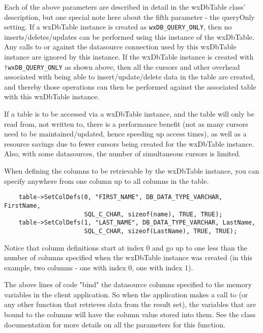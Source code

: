 Each of the above parameters are described in detail in the wxDbTable 
class' description, but one special note here about the fifth 
parameter - the queryOnly setting. If a wxDbTable instance is created as 
{\tt wxDB\_QUERY\_ONLY}, then no inserts/deletes/updates can be performed 
using this instance of the wxDbTable. Any calls to  
or  against the datasource 
connection used by this wxDbTable instance are ignored by this instance. If 
the wxDbTable instance is created with {\tt !wxDB\_QUERY\_ONLY} as shown above, 
then all the cursors and other overhead associated with being able to 
insert/update/delete data in the table are created, and thereby those 
operations can then be performed against the associated table with this 
wxDbTable instance.

If a table is to be accessed via a wxDbTable instance, and the table will 
only be read from, not written to, there is a performance benefit (not as 
many cursors need to be maintained/updated, hence speeding up access times), 
as well as a resource savings due to fewer cursors being created for the 
wxDbTable instance. Also, with some datasources, the number of 
simultaneous cursors is limited. 

When defining the columns to be retrievable by the wxDbTable instance, you 
can specify anywhere from one column up to all columns in the table. 

\begin{verbatim}
    table->SetColDefs(0, "FIRST_NAME", DB_DATA_TYPE_VARCHAR, FirstName,
                      SQL_C_CHAR, sizeof(name), TRUE, TRUE);
    table->SetColDefs(1, "LAST_NAME", DB_DATA_TYPE_VARCHAR, LastName,
                      SQL_C_CHAR, sizeof(LastName), TRUE, TRUE);
\end{verbatim}

Notice that column definitions start at index 0 and go up to one less than 
the number of columns specified when the wxDbTable instance was created 
(in this example, two columns - one with index 0, one with index 1).

The above lines of code "bind" the datasource columns specified to the 
memory variables in the client application. So when the application 
makes a call to  (or any other function that retrieves 
data from the result set), the variables that are bound to the columns will 
have the column value stored into them. See the 
class documentation for more details on all the parameters for this function.

